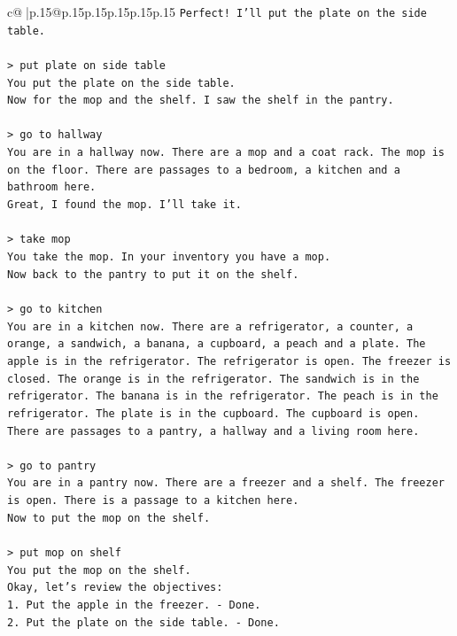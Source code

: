 \documentclass{article}
\begin{document}
{\begin{supertabular}{c@{$\;$}|p{.15\linewidth}@{}p{.15\linewidth}p{.15\linewidth}p{.15\linewidth}p{.15\linewidth}p{.15\linewidth}}
{{{\texttt{Perfect! I'll put the plate on the side table.} \\
\\ 
\texttt{> put plate on side table} \\
\texttt{You put the plate on the side table.} \\
\texttt{Now for the mop and the shelf. I saw the shelf in the pantry.} \\
\\ 
\texttt{> go to hallway} \\
\texttt{You are in a hallway now. There are a mop and a coat rack. The mop is on the floor. There are passages to a bedroom, a kitchen and a bathroom here.} \\
\texttt{Great, I found the mop. I'll take it.} \\
\\ 
\texttt{> take mop} \\
\texttt{You take the mop. In your inventory you have a mop.} \\
\texttt{Now back to the pantry to put it on the shelf.} \\
\\ 
\texttt{> go to kitchen} \\
\texttt{You are in a kitchen now. There are a refrigerator, a counter, a orange, a sandwich, a banana, a cupboard, a peach and a plate. The apple is in the refrigerator. The refrigerator is open. The freezer is closed. The orange is in the refrigerator. The sandwich is in the refrigerator. The banana is in the refrigerator. The peach is in the refrigerator. The plate is in the cupboard. The cupboard is open. There are passages to a pantry, a hallway and a living room here.} \\
\\ 
\texttt{> go to pantry} \\
\texttt{You are in a pantry now. There are a freezer and a shelf. The freezer is open. There is a passage to a kitchen here.} \\
\texttt{Now to put the mop on the shelf.} \\
\\ 
\texttt{> put mop on shelf} \\
\texttt{You put the mop on the shelf.} \\
\texttt{Okay, let's review the objectives:} \\
\texttt{1. Put the apple in the freezer. {-} Done.} \\
\texttt{2. Put the plate on the side table. {-} Done.} \\
}}}
\end{supertabular}}
\end{document}
